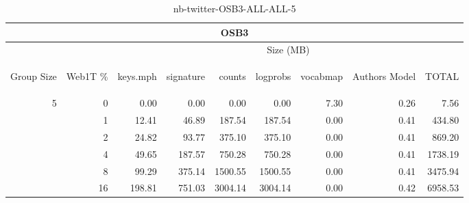 \begin{center}
\begin{table}[htbp] 
 \begin{center}
\begin{tabular}{ | r | r | r | r | r | r | r | r | r |}
\hline
\multicolumn{9}{|c|}{OSB3}\\
\hline
 & & \multicolumn{7}{|c|}{Size (MB)}\\ \cline{3-9}
\begin{sideways}Group Size\end{sideways} & \begin{sideways}Web1T \% \end{sideways} & \begin{sideways}keys.mph\end{sideways} & \begin{sideways}signature\end{sideways} & \begin{sideways}counts\end{sideways} & \begin{sideways}logprobs\end{sideways} & \begin{sideways}vocabmap\end{sideways} & \begin{sideways}Authors Model \end{sideways} & \begin{sideways}TOTAL\end{sideways}\\
\hline
\multirow{5}{*}{5}
 & 0 & 0.00 & 0.00 & 0.00 & 0.00 & 7.30 & 0.26 & 7.56\\ \cline{2-9}
 & 1 & 12.41 & 46.89 & 187.54 & 187.54 & 0.00 & 0.41 & 434.80\\ \cline{2-9}
 & 2 & 24.82 & 93.77 & 375.10 & 375.10 & 0.00 & 0.41 & 869.20\\ \cline{2-9}
 & 4 & 49.65 & 187.57 & 750.28 & 750.28 & 0.00 & 0.41 & 1738.19\\ \cline{2-9}
 & 8 & 99.29 & 375.14 & 1500.55 & 1500.55 & 0.00 & 0.41 & 3475.94\\ \cline{2-9}
 & 16 & 198.81 & 751.03 & 3004.14 & 3004.14 & 0.00 & 0.42 & 6958.53\\ \cline{2-9}
\hline
\end{tabular}
\caption{nb-twitter-OSB3-ALL-ALL-5}
\label{table:nb-twitter-OSB3-ALL-ALL-5}
\end{center}
 \end{table}
\end{center}


